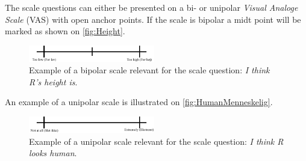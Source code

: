 %
The scale questions can either be presented on a bi- or unipolar \textit{Visual Analoge Scale} (VAS) with open anchor points. If the scale is bipolar a midt point will be marked as shown on \autoref{fig:Height}.
%
\begin{figure}[H]
\centering
\includegraphics[width = 0.49\textwidth]{Figure/HeightHoejde} 
\caption{Example of a bipolar scale relevant for the scale question: \textit{I think R's height is}.}
\label{fig:Height}
\end{figure}
\noindent
% 
An example of a unipolar scale is illustrated on \autoref{fig:HumanMenneskelig}.
%
\begin{figure}[H]
\centering
\includegraphics[width = 0.49\textwidth]{Figure/HumanMenneskelig} 
\caption{Example of a unipolar scale relevant for the scale question: \textit{I think R looks human}.}
\label{fig:HumanMenneskelig}
\end{figure}
\noindent
